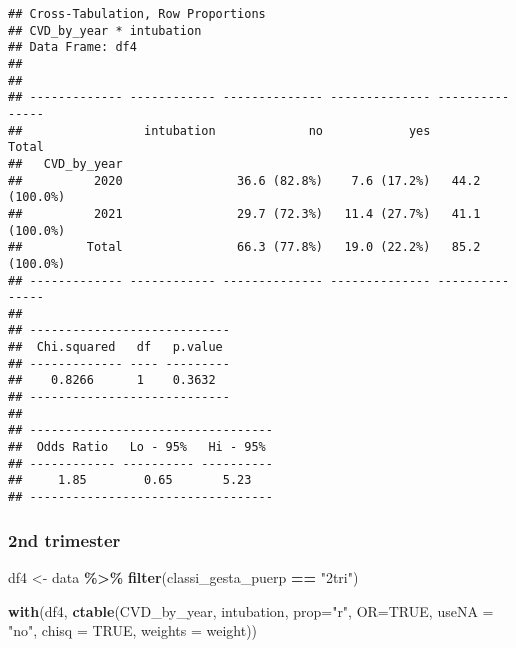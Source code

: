 \documentclass[
]{article}
\newenvironment{Shaded}{\begin{snugshade}}{\end{snugshade}}
\newcommand{\AttributeTok}[1]{\textcolor[rgb]{0.13,0.29,0.53}{#1}}
\newcommand{\ConstantTok}[1]{\textcolor[rgb]{0.56,0.35,0.01}{#1}}
\newcommand{\FunctionTok}[1]{\textcolor[rgb]{0.13,0.29,0.53}{\textbf{#1}}}
\newcommand{\NormalTok}[1]{#1}
\newcommand{\OtherTok}[1]{\textcolor[rgb]{0.56,0.35,0.01}{#1}}
\newcommand{\SpecialCharTok}[1]{\textcolor[rgb]{0.81,0.36,0.00}{\textbf{#1}}}
\newcommand{\StringTok}[1]{\textcolor[rgb]{0.31,0.60,0.02}{#1}}
\begin{document}
\begin{verbatim}
## Cross-Tabulation, Row Proportions  
## CVD_by_year * intubation  
## Data Frame: df4  
## 
## 
## ------------- ------------ -------------- -------------- ---------------
##                 intubation             no            yes           Total
##   CVD_by_year                                                           
##          2020                36.6 (82.8%)    7.6 (17.2%)   44.2 (100.0%)
##          2021                29.7 (72.3%)   11.4 (27.7%)   41.1 (100.0%)
##         Total                66.3 (77.8%)   19.0 (22.2%)   85.2 (100.0%)
## ------------- ------------ -------------- -------------- ---------------
## 
## ----------------------------
##  Chi.squared   df   p.value 
## ------------- ---- ---------
##    0.8266      1    0.3632  
## ----------------------------
## 
## ----------------------------------
##  Odds Ratio   Lo - 95%   Hi - 95% 
## ------------ ---------- ----------
##     1.85        0.65       5.23   
## ----------------------------------
\end{verbatim}

\hypertarget{nd-trimester-10}{%
\subsubsection{2nd trimester}\label{nd-trimester-10}}

\begin{Shaded}
\begin{Highlighting}[]
\NormalTok{df4 }\OtherTok{\textless{}{-}}\NormalTok{ data }\SpecialCharTok{\%\textgreater{}\%} 
  \FunctionTok{filter}\NormalTok{(classi\_gesta\_puerp }\SpecialCharTok{==} \StringTok{"2tri"}\NormalTok{)}

\FunctionTok{with}\NormalTok{(df4, }\FunctionTok{ctable}\NormalTok{(CVD\_by\_year, intubation, }\AttributeTok{prop=}\StringTok{"r"}\NormalTok{, }\AttributeTok{OR=}\ConstantTok{TRUE}\NormalTok{, }\AttributeTok{useNA =} \StringTok{"no"}\NormalTok{, }\AttributeTok{chisq =} \ConstantTok{TRUE}\NormalTok{, }\AttributeTok{weights =}\NormalTok{ weight))}
\end{Highlighting}
\end{Shaded}
\end{document}
